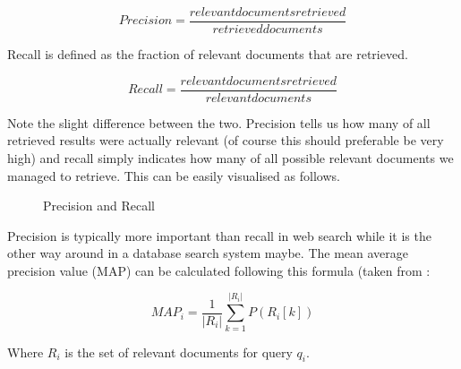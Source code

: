 \begin{equation}
  Precision = \frac{relevant documents retrieved}{retrieved documents}
  \label{eq:precision}
\end{equation}

Recall is defined as the fraction of relevant documents that are retrieved.

\begin{equation}
  Recall = \frac{relevant documents retrieved}{relevant documents}
  \label{eq:recall}
\end{equation}

Note the slight difference between the two. Precision tells us how many of all retrieved results were actually relevant (of course this should preferable be very high) and recall simply indicates how many of all possible relevant documents we managed to retrieve. This can be easily visualised as follows.

\def\leftcircle{(0,0) circle (1.5cm)}
\def\rightcircle{(0:2cm) circle (1.5cm)}

\begin{figure}[htb]
  \centering
\caption[Precision and Recall]{Precision and Recall}
\label{fig:PR}
\end{figure}

Precision is typically more important than recall in web search while it is the other way around in a database search system maybe. The mean average precision value (MAP) can be calculated following this formula (taken from \citep[p.141]{Baeza-Yates2011}:

\begin{equation}
  MAP_i = \frac{1}{|R_i|} \sum_{k=1}^{|R_i|} P(R_i[k])
  \label{eq:MAP}
\end{equation}

Where $R_i$ is the set of relevant documents for query $q_i$.

